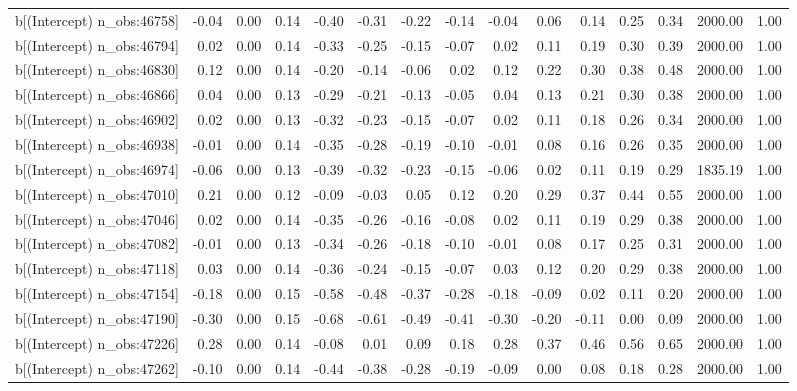 \begin{table}[ht]
\begin{tabular}{rrrrrrrrrrrrrrr}
  b[(Intercept) n\_obs:46758] & -0.04 & 0.00 & 0.14 & -0.40 & -0.31 & -0.22 & -0.14 & -0.04 & 0.06 & 0.14 & 0.25 & 0.34 & 2000.00 & 1.00 \\ 
  b[(Intercept) n\_obs:46794] & 0.02 & 0.00 & 0.14 & -0.33 & -0.25 & -0.15 & -0.07 & 0.02 & 0.11 & 0.19 & 0.30 & 0.39 & 2000.00 & 1.00 \\ 
  b[(Intercept) n\_obs:46830] & 0.12 & 0.00 & 0.14 & -0.20 & -0.14 & -0.06 & 0.02 & 0.12 & 0.22 & 0.30 & 0.38 & 0.48 & 2000.00 & 1.00 \\ 
  b[(Intercept) n\_obs:46866] & 0.04 & 0.00 & 0.13 & -0.29 & -0.21 & -0.13 & -0.05 & 0.04 & 0.13 & 0.21 & 0.30 & 0.38 & 2000.00 & 1.00 \\ 
  b[(Intercept) n\_obs:46902] & 0.02 & 0.00 & 0.13 & -0.32 & -0.23 & -0.15 & -0.07 & 0.02 & 0.11 & 0.18 & 0.26 & 0.34 & 2000.00 & 1.00 \\ 
  b[(Intercept) n\_obs:46938] & -0.01 & 0.00 & 0.14 & -0.35 & -0.28 & -0.19 & -0.10 & -0.01 & 0.08 & 0.16 & 0.26 & 0.35 & 2000.00 & 1.00 \\ 
  b[(Intercept) n\_obs:46974] & -0.06 & 0.00 & 0.13 & -0.39 & -0.32 & -0.23 & -0.15 & -0.06 & 0.02 & 0.11 & 0.19 & 0.29 & 1835.19 & 1.00 \\ 
  b[(Intercept) n\_obs:47010] & 0.21 & 0.00 & 0.12 & -0.09 & -0.03 & 0.05 & 0.12 & 0.20 & 0.29 & 0.37 & 0.44 & 0.55 & 2000.00 & 1.00 \\ 
  b[(Intercept) n\_obs:47046] & 0.02 & 0.00 & 0.14 & -0.35 & -0.26 & -0.16 & -0.08 & 0.02 & 0.11 & 0.19 & 0.29 & 0.38 & 2000.00 & 1.00 \\ 
  b[(Intercept) n\_obs:47082] & -0.01 & 0.00 & 0.13 & -0.34 & -0.26 & -0.18 & -0.10 & -0.01 & 0.08 & 0.17 & 0.25 & 0.31 & 2000.00 & 1.00 \\ 
  b[(Intercept) n\_obs:47118] & 0.03 & 0.00 & 0.14 & -0.36 & -0.24 & -0.15 & -0.07 & 0.03 & 0.12 & 0.20 & 0.29 & 0.38 & 2000.00 & 1.00 \\ 
  b[(Intercept) n\_obs:47154] & -0.18 & 0.00 & 0.15 & -0.58 & -0.48 & -0.37 & -0.28 & -0.18 & -0.09 & 0.02 & 0.11 & 0.20 & 2000.00 & 1.00 \\ 
  b[(Intercept) n\_obs:47190] & -0.30 & 0.00 & 0.15 & -0.68 & -0.61 & -0.49 & -0.41 & -0.30 & -0.20 & -0.11 & 0.00 & 0.09 & 2000.00 & 1.00 \\ 
  b[(Intercept) n\_obs:47226] & 0.28 & 0.00 & 0.14 & -0.08 & 0.01 & 0.09 & 0.18 & 0.28 & 0.37 & 0.46 & 0.56 & 0.65 & 2000.00 & 1.00 \\ 
  b[(Intercept) n\_obs:47262] & -0.10 & 0.00 & 0.14 & -0.44 & -0.38 & -0.28 & -0.19 & -0.09 & 0.00 & 0.08 & 0.18 & 0.28 & 2000.00 & 1.00 \\ 

\end{tabular}
\end{table}
